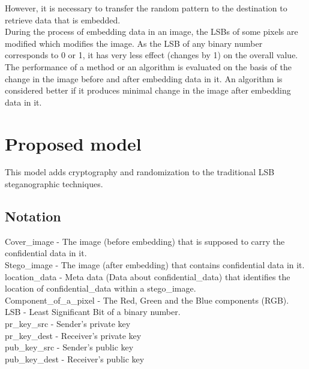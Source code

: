 \documentclass[conference]{IEEEtran}
\begin{document}
However, it is necessary to transfer the random pattern to the destination to retrieve data that is embedded. \\

During the process of embedding data in an image, the LSBs of some pixels are modified which modifies the image.
As the LSB of any binary number corresponds to 0 or 1, it has very less effect (changes by 1) on the overall value.\\ 

The performance of a method or an algorithm is evaluated on the basis of the change in the image before and after embedding data in it.
An algorithm is considered better if it produces minimal change in the image after embedding data in it.\\

\section{Proposed model}
This model adds cryptography and randomization to the traditional LSB steganographic techniques.

\subsection{Notation}
Cover\_image - The image (before embedding) that is supposed to carry the confidential data in it. \\

Stego\_image - The image (after embedding) that contains confidential data in it. \\

location\_data - Meta data (Data about confidential\_data) that identifies the location of confidential\_data within a stego\_image. \\

Component\_of\_a\_pixel - The Red, Green and the Blue components (RGB). \\

LSB - Least Significant Bit of a binary number. \\

pr\_key\_src - Sender's private key \\

pr\_key\_dest - Receiver's private key \\

pub\_key\_src - Sender's public key \\

pub\_key\_dest - Receiver's public key \\
\end{document}
